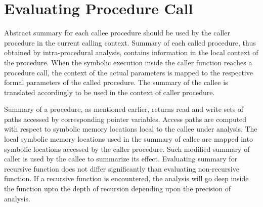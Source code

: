 \section{Evaluating Procedure Call}
\label{sec:interProc}
Abstract summary for each callee procedure should be 
used by the caller procedure in the current calling context. 
Summary of each called procedure, thus obtained by intra-procedural analysis, 
contains information in the local context of the procedure.
When the symbolic execution inside the caller function reaches a procedure call, 
the context of the actual parameters is mapped to the respective 
formal parameters of the called procedure. The summary of the callee is 
translated accordingly to be used in the context of caller procedure. 

Summary of a procedure, as mentioned earlier, returns read and write sets 
of paths accessed by corresponding pointer variables. Access paths 
are computed with respect to symbolic memory locations local to the callee  
under analysis. The local symbolic memory locations used in the 
summary of callee are 
mapped into symbolic locations accessed by the caller procedure. 
Such modified summary of caller is used by the callee to summarize its effect. 
Evaluating summary for recursive function does not differ significantly than evaluating non-recursive function. If a recursive function is encountered, the 
analysis will go deep inside the function upto the depth of recursion depending 
upon the precision of analysis. 
